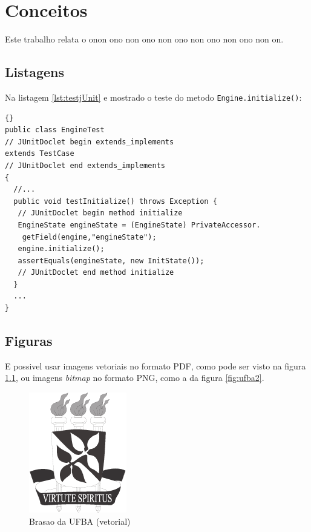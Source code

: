 \chapter{Conceitos} \label{cap:conceitos}

Este trabalho relata o onon ono non ono non ono non ono non ono non on.

\section{Listagens} \label{sec:listagens}

Na listagem \ref{lst:testjUnit} 
e mostrado o teste do metodo \texttt{Engine.initialize()}:

\lstset{language=java}
\lstset{commentstyle=\textit}
\begin{lstlisting}[frame=trbl, caption=Classe Factory2D,label=lst:testjUnit]{}
public class EngineTest
// JUnitDoclet begin extends_implements
extends TestCase
// JUnitDoclet end extends_implements
{
  //...
  public void testInitialize() throws Exception {
   // JUnitDoclet begin method initialize
   EngineState engineState = (EngineState) PrivateAccessor.
    getField(engine,"engineState");
   engine.initialize();
   assertEquals(engineState, new InitState());
   // JUnitDoclet end method initialize
  }
  ...
}
\end{lstlisting}

\section{Figuras} \label{sec:figuras}

E possivel usar imagens vetoriais no formato PDF, como pode ser visto
na figura \ref{fig:ufba}, ou imagens \emph{bitmap} no formato PNG, como
a da figura \ref{fig:ufba2}.

\begin{figure}
\centering
\includegraphics{brasaoUFBA2}
\caption{Brasao da UFBA (vetorial)}
\label{fig:ufba}
\end{figure}

